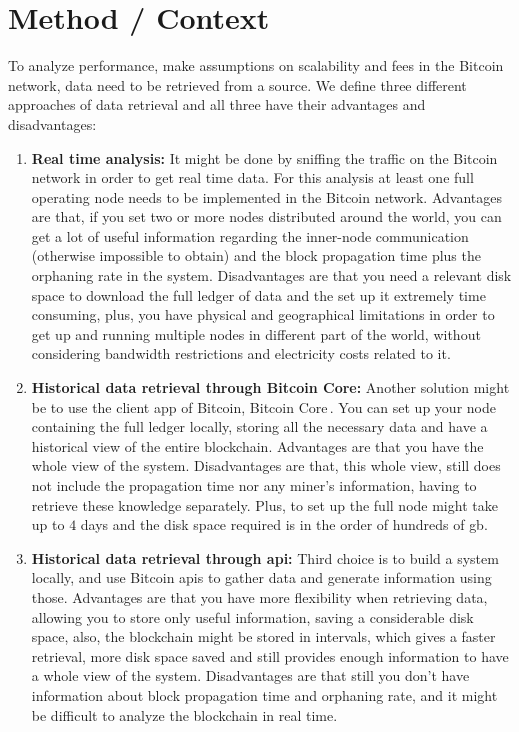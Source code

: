 \documentclass[USenglish]{uit-thesis}
\begin{document}
\section{Method / Context}
\label{sec:method}
To analyze performance,
make assumptions on scalability and fees in the Bitcoin
network, data need to be retrieved from a source.
We define three different approaches of data retrieval
and all three have their advantages and disadvantages:
\begin{enumerate}
	\item \textbf{Real time analysis:} It might be done by sniffing the traffic
	on the Bitcoin network in order to get real time data.
	For this analysis at least one full operating node
	needs to be implemented in the Bitcoin network.
	Advantages are that, if you set two or more nodes distributed around the world,
	you can get a lot of useful information regarding the inner-node
	communication (otherwise impossible to obtain) and the block
	propagation time plus the orphaning rate in the system. Disadvantages are
	that you need a relevant disk space to download the full ledger of data
	and the set up it extremely time consuming, plus, you have physical
	and geographical limitations
	in order to get up and running multiple nodes
	in different part of the world, without considering
	bandwidth restrictions and electricity
	costs related to it.
	\item \textbf{Historical data retrieval through Bitcoin Core:} Another solution might
	be to use the client app of
	Bitcoin, Bitcoin Core\,\cite{bitcoincore}.
	You can set up your node containing the full ledger
	locally, storing all the necessary data and have a historical view of the
	entire blockchain. Advantages are that you have the whole view of the system.
	Disadvantages are that, this whole view, still does not include the propagation time nor
	any miner's information, having to retrieve these knowledge separately.
	Plus, to set up the full node might take up to $4$ days and the
	disk space required is in the order of hundreds of \gls{gb}.
	\item \textbf{Historical data retrieval through \gls{api}:} Third choice is to build a system
	locally, and use Bitcoin \gls{api}s to gather data and generate information
	using those. Advantages are that you have more flexibility when retrieving data, allowing
	you to store only useful information, saving a considerable disk space, also,
	the blockchain might be stored in intervals, which gives a faster retrieval,
	more disk space saved and still provides enough information to have a whole
	view of the system. Disadvantages are that still you don't have information about
	block propagation time and orphaning rate, and it might be difficult
	to analyze the blockchain in real time.
\end{enumerate}
\end{document}
